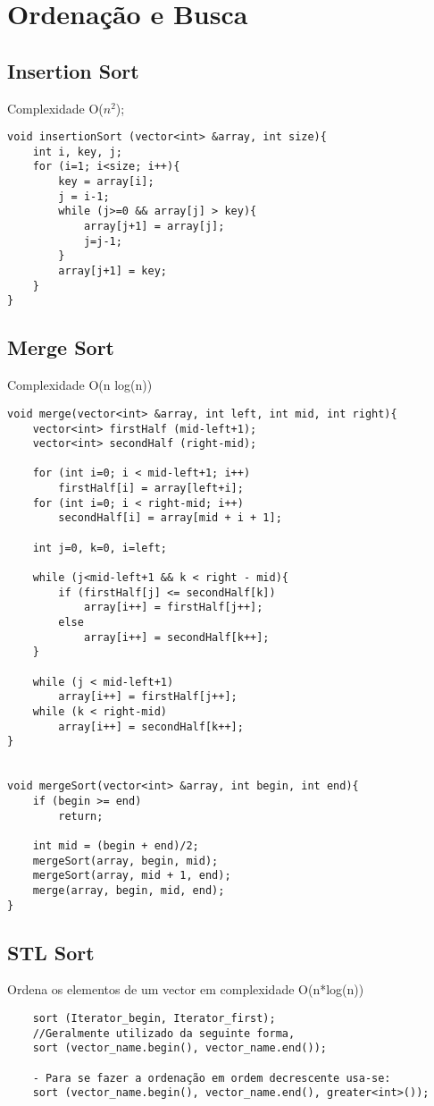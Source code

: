 \section{Ordenação e Busca}

\subsection{Insertion Sort}
Complexidade O($n^2$);
\begin{verbatim}
void insertionSort (vector<int> &array, int size){
    int i, key, j;
    for (i=1; i<size; i++){
        key = array[i];
        j = i-1;
        while (j>=0 && array[j] > key){
            array[j+1] = array[j];
            j=j-1;
        }
        array[j+1] = key;
    }
}
\end{verbatim}

\subsection{Merge Sort}
Complexidade O(n log(n))
\begin{verbatim}
void merge(vector<int> &array, int left, int mid, int right){
    vector<int> firstHalf (mid-left+1);
    vector<int> secondHalf (right-mid);
 
    for (int i=0; i < mid-left+1; i++)  
        firstHalf[i] = array[left+i];
    for (int i=0; i < right-mid; i++)
        secondHalf[i] = array[mid + i + 1];

    int j=0, k=0, i=left; 

    while (j<mid-left+1 && k < right - mid){
        if (firstHalf[j] <= secondHalf[k])
            array[i++] = firstHalf[j++];
        else
            array[i++] = secondHalf[k++];
    }

    while (j < mid-left+1)
        array[i++] = firstHalf[j++];
    while (k < right-mid)
        array[i++] = secondHalf[k++];
}
 

void mergeSort(vector<int> &array, int begin, int end){
    if (begin >= end)
        return;
 
    int mid = (begin + end)/2;
    mergeSort(array, begin, mid);
    mergeSort(array, mid + 1, end);
    merge(array, begin, mid, end);
}
\end{verbatim}

\subsection{STL Sort}
    Ordena os elementos de um vector em complexidade O(n*log(n))
\begin{verbatim}
    sort (Iterator_begin, Iterator_first);
    //Geralmente utilizado da seguinte forma,
    sort (vector_name.begin(), vector_name.end());

    - Para se fazer a ordenação em ordem decrescente usa-se:
    sort (vector_name.begin(), vector_name.end(), greater<int>());
\end{verbatim}

